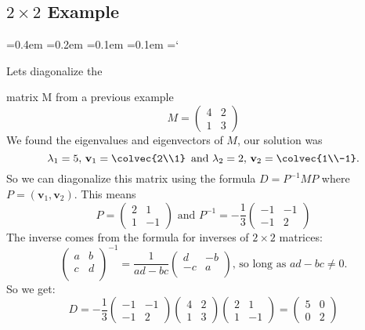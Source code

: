 
\subsection*{$2\times2$ Example}

{\ttfamily
{}\font=0.4em
\font=0.2em
\font=0.1em
\font=0.1em
\hyphenchar\font=`\-


\hypertarget{scripts_diagonalization_example}{Lets diagonalize the} matrix M from a previous example
\[
M = 
\begin{pmatrix}
4 & 2\\
1 &3 
\end{pmatrix}
\]
We found the eigenvalues and eigenvectors of $M$, our solution was \[
\lambda_1 = 5, \, \mathbf{v}_1= \colvec{2\\1} \, \text{ and } \lambda_2 = 2, \, \mathbf{v}_2=\colvec{1\\-1}.
\]
So we can diagonalize this matrix using the formula $D = P^{-1}MP$ where $P= (\mathbf{v}_1, \mathbf{v}_2)$. This means
\[
P = \begin{pmatrix}
2 &1\\
1 &-1 
\end{pmatrix}
\text{ and }
P^{-1} = -\frac{1}{3}\begin{pmatrix}
-1 &-1\\
-1 &2 
\end{pmatrix}
\]
The inverse comes from the formula for inverses of $2\times2$ matrices:
\[\begin{pmatrix}
a & b \\
c & d \\
\end{pmatrix}^{-1}=\frac{1}{ad-bc}\begin{pmatrix}
d & -b \\
-c & a \\
\end{pmatrix} \text{, so long as } ad-bc\neq 0.
\] So we get:
\[
D = -\frac{1}{3}\begin{pmatrix}
-1 &-1\\
-1 &2 
\end{pmatrix}
\begin{pmatrix}
4 & 2\\
1 &3 
\end{pmatrix}
 \begin{pmatrix}
2 &1\\
1 &-1 
\end{pmatrix}
=\begin{pmatrix}
5 &0\\
0 & 2
\end{pmatrix}
\]

}
